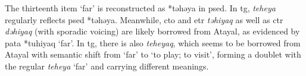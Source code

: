 
The thirteenth item `far' is reconstructed as *təhəya in \acl{psed}. In \acl{tg}, \textit{teheya} regularly reflects \acl{psed} *təhəya. Meanwhile, \acl{cto} and \acl{etr} \textit{təhiyaq} as well as \acl{ctr} \textit{dəhiyaq} (with sporadic voicing) are likely borrowed from Atayal, as evidenced by \acl{pata} *tuhiyaq `far'. In \acl{tg}, there is also \textit{teheyaq}, which seems to be borrowed from Atayal with semantic shift from `far' to `to play; to visit', forming a doublet with the regular \textit{teheya} `far' and carrying different meanings.




